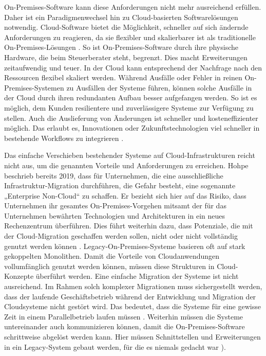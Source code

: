 On-Premises-Software kann diese Anforderungen nicht mehr ausreichend erfüllen. Daher ist ein Paradigmenwechsel hin zu Cloud-basierten Softwarelösungen notwendig.
Cloud-Software bietet die Möglichkeit, schneller auf sich ändernde Anforderungen zu reagieren, da sie flexibler und skalierbarer ist als traditionelle On-Premises-Lösungen \cite{Sharma2022}.
So ist On-Premises-Software durch ihre physische Hardware, die beim Steuerberater steht, begrenzt. Dies macht Erweiterungen zeitaufwendig und teuer. In der Cloud kann entsprechend der Nachfrage nach den Ressourcen flexibel skaliert werden. Während Ausfälle oder Fehler in reinen On-Premises-Systemen zu Ausfällen der Systeme führen, können solche Ausfälle in der Cloud durch ihren redundanten Aufbau besser aufgefangen werden. So ist es möglich, dem Kunden resilientere und zuverlässigere Systeme zur Verfügung zu stellen. Auch die Auslieferung von Änderungen ist schneller und kosteneffizienter möglich. Das erlaubt es, Innovationen oder Zukunftstechnologien viel schneller in bestehende Workflows zu integrieren \cite[S. 479 f.]{Sharma2022}.

Das einfache Verschieben bestehender Systeme auf Cloud-Infrastrukturen reicht nicht aus, um die genannten Vorteile und Anforderungen zu erreichen.
Hohpe beschrieb bereits 2019, dass für Unternehmen, die eine ausschließliche Infrastruktur-Migration durchführen, die Gefahr besteht, eine sogenannte „Enterprise Non-Cloud“ zu schaffen. Er bezieht sich hier auf das Risiko, dass Unternehmen ihr gesamtes On-Premises-Vorgehen mitsamt der für das Unternehmen bewährten Technologien und Architekturen in ein neues Rechenzentrum überführen. Dies führt weiterhin dazu, dass Potenziale, die mit der Cloud-Migration geschaffen werden sollen, nicht oder nicht vollständig genutzt werden können \cite{Hohpe2020}.
Legacy-On-Premises-Systeme basieren oft auf stark gekoppelten Monolithen. Damit die Vorteile von Cloudanwendungen vollumfänglich genutzt werden können, müssen diese Strukturen in Cloud-Konzepte überführt werden. Eine einfache Migration der Systeme ist nicht ausreichend.
Im Rahmen solch komplexer Migrationen muss sichergestellt werden, dass der laufende Geschäftsbetrieb während der Entwicklung und Migration der Cloudsysteme nicht gestört wird. Das bedeutet, dass die Systeme für eine gewisse Zeit in einem Parallelbetrieb laufen müssen \cite[S. 480 f.]{Sharma2022}. Weiterhin müssen die Systeme untereinander auch kommunizieren können, damit die On-Premises-Software schrittweise abgelöst werden kann. Hier müssen Schnittstellen und Erweiterungen in ein Legacy-System gebaut werden, für die es niemals gedacht war  \cite[Kap.~3, Abschn. „Pattern: Strangler Fig Application“]{Newman2019}).

